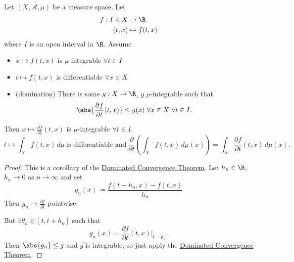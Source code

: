 \documentclass{article}
\newcommand{\1}[1]{\mathbbm{1}_{#1}}
\begin{document}
\begin{cor}
    Let $(X, \mathcal{A}, \mu)$ be a measure space.
    Let
    \begin{align*}
        f:I \times X &\to \R \\
        (t, x) &\mapsto f(t, x)
    \end{align*}
    where $I$ is an open interval in $\R$.
    Assume
    \begin{itemize}
        \item $x \mapsto f(t, x)$ is $\mu$-integrable $\forall t \in I$
        \item $t \mapsto f(t, x)$ is differentiable $\forall x \in X$
        \item (domination) There is some $g: X \to \R$, $g$ $\mu$-integrable such that
            \begin{equation*}\abs{\frac{\partial f}{\partial t}(t, x)} \leq g(x) \; \forall x \in X \ \forall t \in I.\end{equation*}
    \end{itemize}

    Then $x \mapsto \frac{\partial f}{\partial t} (t, x)$ is $\mu$-integrable $\forall t \in I$.
    \begin{equation*}
        t \mapsto \int_X f(t, x)\, d \mu \ \text{is differentiable and} \ \frac{\partial}{\partial t} \left( \int_X f(t, x)\, d \mu(x)\right) = \int_X \frac{\partial f}{\partial t} (t, x)\, d \mu(x).
    \end{equation*}
\end{cor}

\begin{proof}
    This is a corollary of the \hyperlink{thm:dct}{Dominated Convergence Theorem}. Let $h_n \in \R$, $h_n \to 0$ as $n \to \infty$ and set
    \begin{equation*}
        g_n(x) \coloneqq \frac{f(t + h_n, x) - f(t, x)}{h_n}
    \end{equation*}
    Then $g_n \to \frac{\partial f}{\partial t}$ pointwise.

    But $\exists \theta_n \in [t, t+h_n]$ such that \begin{equation*}g_n(x) = \frac{\partial f}{\partial t}(t, x) \bigg|_{t=\theta_n}.\end{equation*}
    Then $\abs{g_n} \leq g$ and $g$ is integrable, so just apply the \hyperlink{thm:dct}{Dominated Convergence Theorem}. \qedhere
\end{proof}
\end{document}

